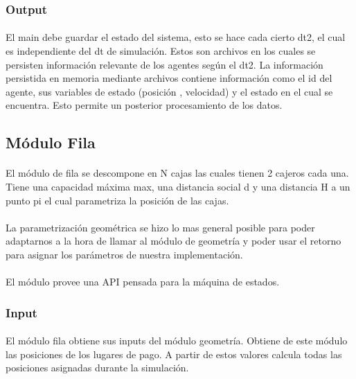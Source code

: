 \documentclass{article}
\begin{document}
\subsubsection{Output}

\paragraph{}
El main debe guardar el estado del sistema, esto se hace cada cierto dt2, el cual es independiente del dt de simulación. Estos son archivos en los cuales se persisten información relevante de los agentes según el dt2. La información persistida en memoria mediante archivos contiene información como el id del agente, sus variables de estado (posición , velocidad) y el estado en el cual se encuentra. Esto permite un posterior procesamiento de los datos.


\subsection{Módulo Fila}

\paragraph{}
El módulo de fila se descompone en N cajas las cuales tienen 2 cajeros cada una. Tiene una capacidad máxima max, una distancia social d y una distancia H a un punto pi el cual parametriza la posición de las cajas.

\paragraph{}
La parametrización geométrica se hizo lo mas general posible para poder adaptarnos a la hora de llamar al módulo de geometría y poder usar el retorno para asignar los parámetros de nuestra implementación.

\paragraph{}
El módulo provee una API pensada para la máquina de estados.

\subsubsection{Input}

\paragraph{}
El módulo fila obtiene sus inputs del módulo geometría. Obtiene de este módulo las posiciones de los lugares de pago. A partir de estos valores calcula todas las posiciones asignadas durante la simulación.
\end{document}
